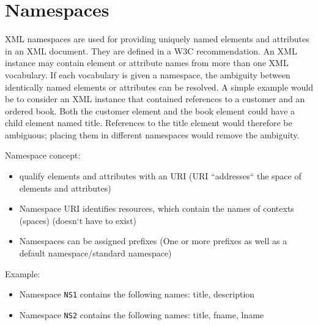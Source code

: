 \documentclass[11pt]{article}
\begin{document}
\section{Namespaces}
\label{sec:orgf96decc}
XML namespaces are used for providing uniquely named elements and attributes in an XML document. They are defined in a W3C recommendation. An XML instance may contain element or attribute names from more than one XML vocabulary. If each vocabulary is given a namespace, the ambiguity between identically named elements or attributes can be resolved.
A simple example would be to consider an XML instance that contained references to a customer and an ordered book. Both the customer element and the book element could have a child element named title. References to the title element would therefore be ambiguous; placing them in different namespaces would remove the ambiguity.

Namespace concept:
\begin{itemize}
\item qualify elements and attributes with an URI (URI “addresses“ the space of elements and attributes)
\item Namespace URI identifies resources, which contain the names of contexts (spaces) (doesn‘t have to exist)
\item Namespaces can be assigned prefixes (One or more prefixes as well as a default namespace/standard namespace)
\end{itemize}

Example:
\begin{itemize}
\item Namespace \texttt{NS1} contains the following names: title, description
\item Namespace \texttt{NS2} contains the following names: title, fname, lname
\end{itemize}
\end{document}
